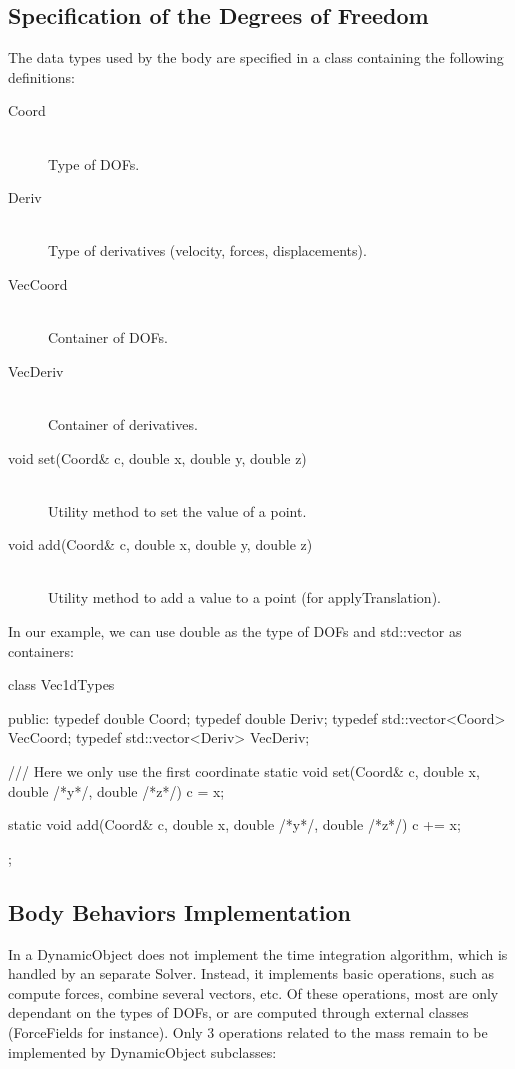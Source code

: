 \subsection{Specification of the Degrees of Freedom}\label{sec:DOF}

The data types used by the body are specified in a class containing the following definitions:

\begin{description}
\item[Coord]~\\
 Type of DOFs.
\item[Deriv]~\\
 Type of derivatives (velocity, forces, displacements).
\item[VecCoord]~\\
 Container of DOFs.
\item[VecDeriv]~\\
 Container of derivatives.
\item[void set(Coord\& c, double x, double y, double z)]~\\
 Utility method to set the value of a point.
\item[void add(Coord\& c, double x, double y, double z)]~\\
 Utility method to add a value to a point (for applyTranslation).

\end{description}

In our example, we can use double as the type of DOFs and std::vector as containers:

\begin{code_cpp}
class Vec1dTypes
{
public:
  typedef double Coord;
  typedef double Deriv;
  typedef std::vector<Coord> VecCoord;
  typedef std::vector<Deriv> VecDeriv;
  
  /// Here we only use the first coordinate
  static void set(Coord& c, double x, double /*y*/, double /*z*/)
  {
    c = x;
  }
  
  static void add(Coord& c, double x, double /*y*/, double /*z*/)
  {
    c += x;
  }
};
\end{code_cpp}

\subsection{Body Behaviors Implementation}

In \sofa{} a DynamicObject does not implement the time integration algorithm, which is handled by an separate Solver. Instead, it implements basic operations, such as compute forces, combine several vectors, etc. Of these operations, most are only dependant on the types of DOFs, or are computed through external classes (ForceFields for instance). Only 3 operations related to the mass remain to be implemented by DynamicObject subclasses:

